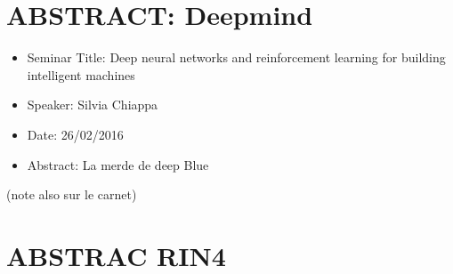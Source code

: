 \documentclass[10pt,letterpaper]{article}
\begin{document}
\section{ABSTRACT: Deepmind}
\begin{itemize}
    \item Seminar Title: Deep neural networks and reinforcement learning for building intelligent machines
    \item Speaker: Silvia Chiappa
    \item Date: 26/02/2016
    \item Abstract: La merde de deep Blue
\end{itemize}
(note also sur le carnet)


\section{ABSTRAC RIN4}
\end{document}
